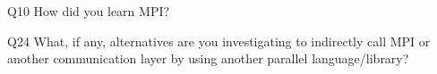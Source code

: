 \begin{description}%
\item{Q10} How did you learn MPI?%
\item{Q24} What, if any, alternatives are you investigating to indirectly call MPI or another communication layer by using another parallel language/library?%
\end{description}%
